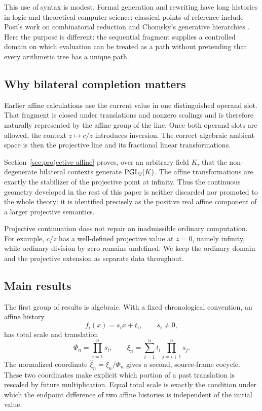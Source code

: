 This use of syntax is modest.  Formal generation and rewriting have long histories
in logic and theoretical computer science; classical points of reference include
Post's work on combinatorial reduction and Chomsky's generative hierarchies
\cite{Post1943FormalRO,Chomsky1956ThreeMF}.  Here the purpose is different: the
sequential fragment supplies a controlled domain on which evaluation can be treated
as a path without pretending that every arithmetic tree has a unique path.

\subsection{Why bilateral completion matters}

Earlier affine calculations use the current value in one distinguished operand slot.
That fragment is closed under translations and nonzero scalings and is therefore
naturally represented by the affine group of the line.  Once both operand slots are
allowed, the context $z\mapsto c/z$ introduces inversion.  The correct algebraic
ambient space is then the projective line and its fractional linear transformations.

Section~\ref{sec:projective-affine} proves, over an arbitrary field $K$, that the
non-degenerate bilateral contexts generate $\operatorname{PGL}_2(K)$.  The affine transformations
are exactly the stabilizer of the projective point at infinity.  Thus the continuous
geometry developed in the rest of this paper is neither discarded nor promoted to
the whole theory: it is identified precisely as the positive real affine component
of a larger projective semantics.

Projective continuation does not repair an inadmissible ordinary computation.  For
example, $c/z$ has a well-defined projective value at $z=0$, namely infinity, while
ordinary division by zero remains undefined.  We keep the ordinary domain and the
projective extension as separate data throughout.

\subsection{Main results}

The first group of results is algebraic.  With a fixed chronological convention,
an affine history
\[
 f_i(x)=s_i x+t_i,
 \qquad s_i\ne0,
\]
has total scale and translation
\[
 \Phi_n=\prod_{i=1}^n s_i,
 \qquad
 \xi_n=\sum_{i=1}^n t_i\prod_{j=i+1}^n s_j.
\]
The normalized coordinate $\widehat\xi_n=\xi_n/\Phi_n$ gives a second, source-frame
cocycle.  These two coordinates make explicit which portion of a past translation is
rescaled by future multiplication.  Equal total scale is exactly the condition under
which the endpoint difference of two affine histories is independent of the initial
value.


